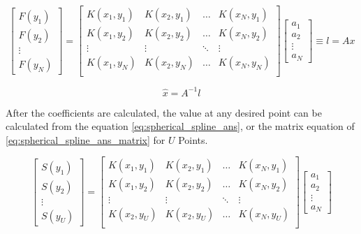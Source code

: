 \documentclass[12pt]{article}
\begin{document}
	\begin{equation}
		\begin{bmatrix}
			F(y_1) \\ F(y_2) \\ \vdots \\ F(y_N) 
		\end{bmatrix}
		= 
		\begin{bmatrix}
			K(x_1,y_1) & K(x_2,y_1) & \dots & K(x_N,y_1) \\
			K(x_1,y_2) & K(x_2,y_2) & \dots & K(x_N,y_2) \\
			\vdots & \vdots & \ddots & \vdots \\
			K(x_1,y_N) & K(x_2,y_N) & \dots & K(x_N,y_N) \\
		\end{bmatrix}
		\begin{bmatrix}
			a_1 \\ a_2 \\ \vdots \\ a_N
		\end{bmatrix}
		\equiv l = Ax
		\label{eq:cal_coeff_matrix}
	\end{equation}
	
	\begin{equation}
		\hat{x}=A^{-1}l
	\end{equation}
	
	After the coefficients are calculated, the value at any desired point can be calculated from the equation \ref{eq:spherical_spline_ans}, or the matrix equation of \ref{eq:spherical_spline_ans_matrix} for $U$ Points.
	
	\begin{equation}
		\begin{bmatrix}
			S(y_1) \\ S(y_2) \\ \vdots \\ S(y_U) 
		\end{bmatrix}
		= 
		\begin{bmatrix}
			K(x_1,y_1) & K(x_2,y_1) & \dots & K(x_N,y_1) \\
			K(x_1,y_2) & K(x_2,y_2) & \dots & K(x_N,y_2) \\
			\vdots & \vdots & \ddots & \vdots \\
			K(x_2,y_U) & K(x_2,y_U) & \dots & K(x_N,y_U) \\
		\end{bmatrix}
		\begin{bmatrix}
			a_1 \\ a_2 \\ \vdots \\ a_N
		\end{bmatrix}
		\label{eq:spherical_spline_ans_matrix}
	\end{equation}
	
\end{document}
